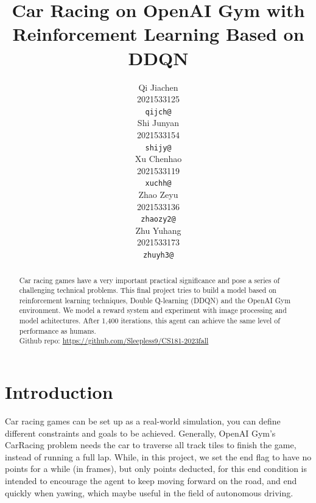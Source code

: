 \documentclass{article}
\title{Car Racing on OpenAI Gym with Reinforcement Learning Based on DDQN}
\author{%
  Qi Jiachen \\
  2021533125 \\
  \texttt{qijch@} \\
  \And
  Shi Junyan \\
  2021533154 \\
  \texttt{shijy@} \\
  \AND
  Xu Chenhao \\
  2021533119 \\
  \texttt{xuchh@} \\
  \And
  Zhao Zeyu \\
  2021533136 \\
  \texttt{zhaozy2@} \\
  \And
  Zhu Yuhang \\
  2021533173 \\
  \texttt{zhuyh3@} \\
}
\begin{document}
\maketitle


\begin{abstract}
  Car racing games have a very important practical significance and 
  pose a series of challenging technical problems. This final project 
  tries to build a model based on reinforcement learning techniques, 
  Double Q-learning (DDQN) and the OpenAI Gym environment.  We model a 
  reward system and experiment with image processing and model achitectures. 
  After 1,400 iterations, this agent can achieve the same level of performance as humans.
   \\
  Github repo: \url{https://github.com/Sleepless9/CS181-2023fall}
\end{abstract}


\section{Introduction}

Car racing games can be set up as a real-world simulation, you can define different 
constraints and goals to be achieved. Generally, OpenAI Gym's CarRacing problem needs 
the car to traverse all track tiles to finish the game, instead of running a full lap. 
While, in this project, we set the end flag to have no points for a while (in frames), 
but only points deducted, for this end condition is intended to encourage the agent to 
keep moving forward on the road, and end quickly when yawing, which maybe useful in the 
field of autonomous driving.




\end{document}
